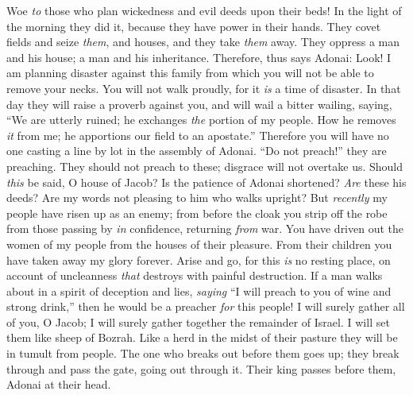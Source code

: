 \begin{biblechapter} %
 Woe \textit{to} those who plan wickedness 
and evil deeds upon their beds! 
In the light of the morning they did it, 
because they have power in their hands.
\verse They covet fields and seize \textit{them}, 
and houses, and they take \textit{them} away. 
They oppress a man and his house; 
a man and his inheritance.
\verse Therefore, thus says Adonai: Look! I am planning disaster against this family from which you will not be able to remove your necks. You will not walk proudly, for it \textit{is} a time of disaster.
\verse In that day they will raise a proverb against you, 
and will wail a bitter wailing, saying, 
“We are utterly ruined; 
he exchanges \textit{the} portion of my people. 
How he removes \textit{it} from me; 
he apportions our field to an apostate.”
\verse Therefore you will have no one casting a line by lot 
in the assembly of Adonai.
\verse “Do not preach!” they are preaching. 
They should not preach to these; 
disgrace will not overtake us.
\verse Should \textit{this} be said, O house of Jacob? 
Is the patience of Adonai shortened? 
\textit{Are} these his deeds? 
Are my words not pleasing 
to him who walks upright?
\verse But \textit{recently} my people have risen up as an enemy; 
from before the cloak you strip off the robe 
from those passing by \textit{in} confidence, 
returning \textit{from} war.
\verse You have driven out the women of my people 
from the houses of their pleasure. 
From their children you have taken away 
my glory forever.
\verse Arise and go, 
for this \textit{is} no resting place, 
on account of uncleanness \textit{that} destroys 
with painful destruction.
\verse If a man walks about in a spirit of deception and lies, 
\textit{saying} “I will preach to you of wine and strong drink,” 
then he would be a preacher \textit{for} this people!
\verse I will surely gather all of you, O Jacob; 
I will surely gather together the remainder of Israel. 
I will set them like sheep of Bozrah. 
Like a herd in the midst of their pasture 
they will be in tumult from people.
\verse The one who breaks out before them goes up; 
they break through and pass the gate, 
going out through it. 
Their king passes before them, 
Adonai at their head.
\end{biblechapter}

